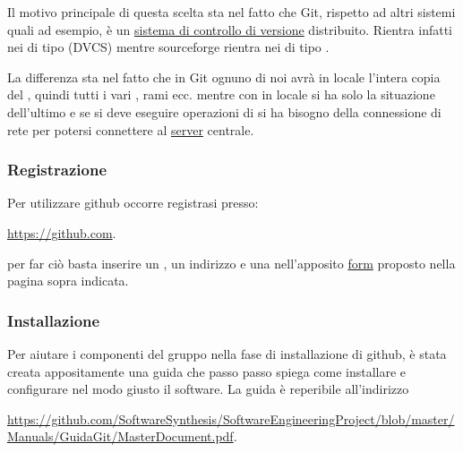 Il motivo principale di questa scelta sta nel fatto che Git, rispetto ad altri sistemi quali  ad esempio, è un \underline{sistema di controllo di versione} distribuito. Rientra infatti nei  di tipo  (DVCS) mentre sourceforge rientra nei  di tipo .

La differenza sta nel fatto che in Git ognuno di noi avrà in locale l'intera copia del , quindi tutti i vari , rami ecc. mentre con  in locale si ha solo la situazione dell'ultimo  e se si deve eseguire operazioni di  si ha bisogno della connessione di rete per potersi connettere al \underline{server} centrale.

\subsubsection{Registrazione}
Per utilizzare github occorre registrasi presso:
\begin{center}
\url{https://github.com}.
\end{center}
per far ciò basta inserire un , un indirizzo  e una  nell'apposito \underline{form} proposto nella pagina sopra indicata.

\subsubsection{Installazione}
Per aiutare i componenti del gruppo nella fase di installazione di github, è stata creata appositamente una guida che passo passo spiega come installare e configurare nel modo giusto il software. La guida è reperibile all'indirizzo
\begin{center}
\url{https://github.com/SoftwareSynthesis/SoftwareEngineeringProject/blob/master/Manuals/GuidaGit/MasterDocument.pdf}.
\end{center}

